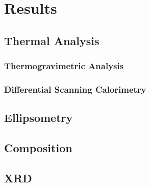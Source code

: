 \chapter{Results}
\label{ch:results}
\thispagestyle{empty}



\section{Thermal Analysis}
\label{chap:Results-Thermal}



\subsection{Thermogravimetric Analysis}



\subsection{Differential Scanning Calorimetry}


\section{Ellipsometry}
\label{chap:Results-Ellipsometry}

\lipsum


\section{Composition}
\label{chap:Results-Composition}

\lipsum



\section{XRD}
\label{chap:Results-XRD}

\lipsum









